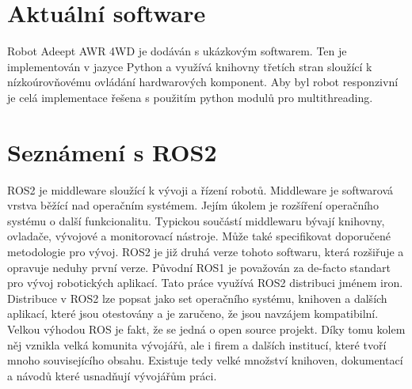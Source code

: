 
\section{Aktuální software}
Robot Adeept AWR 4WD je dodáván s ukázkovým softwarem. Ten je implementován v jazyce Python a využívá knihovny třetích stran sloužící k nízkoúrovňovému ovládání hardwarových komponent. Aby byl robot responzivní je celá implementace řešena s použitím python modulů pro multithreading.

\section{Seznámení s ROS2}
ROS2 je middleware sloužící k vývoji a řízení robotů. Middleware je softwarová vrstva běžící nad operačním systémem. Jejím úkolem je rozšíření operačního systému o další funkcionalitu. Typickou součástí middlewaru bývají knihovny, ovladače, vývojové a monitorovací nástroje. Může také specifikovat doporučené metodologie pro vývoj. ROS2 je již druhá verze tohoto softwaru, která rozšiřuje a opravuje neduhy první verze. Původní ROS1 je považován za de-facto standart pro vývoj robotických aplikací.
Tato práce využívá ROS2 distribuci jménem iron. Distribuce v ROS2 lze popsat jako set operačního systému, knihoven a dalších aplikací, které jsou otestovány a je zaručeno, že jsou navzájem kompatibilní. Velkou výhodou ROS je fakt, že se jedná o open source projekt. Díky tomu kolem něj vznikla velká komunita vývojářů, ale i firem a dalších institucí, které tvoří mnoho souvisejícího obsahu. Existuje tedy velké množství knihoven, dokumentací a návodů které usnadňují vývojářům práci. \cite{ros2_introduction}

